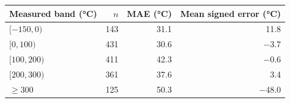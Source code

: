 \begin{tabular}{@{}lrrr@{}}
\toprule
Measured \Tg{} band (\unit{\celsius}) & $n$ & MAE (\unit{\celsius}) & Mean signed error (\unit{\celsius}) \\
\midrule
$[-150, 0)$ & 143 & 31.1 & \num{+11.8} \\
$[0, 100)$ & 431 & 30.6 & \num{-3.7} \\
$[100, 200)$ & 411 & 42.3 & \num{-0.6} \\
$[200, 300)$ & 361 & 37.6 & \num{+3.4} \\
$\geq 300$ & 125 & 50.3 & \num{-48.0} \\
\bottomrule
\end{tabular}
